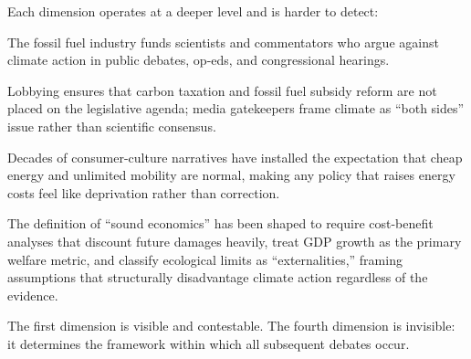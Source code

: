 Each dimension operates at a deeper level and is harder to detect:

\begin{center}
\end{center}

\begin{example}
\label{ex:four-dimensions-climate}
\begin{description}[nosep]
  \item[First dimension:] The fossil fuel industry funds scientists and commentators who argue against climate action in public debates, op-eds, and congressional hearings.
  \item[Second dimension:] Lobbying ensures that carbon taxation and fossil fuel subsidy reform are not placed on the legislative agenda; media gatekeepers frame climate as ``both sides'' issue rather than scientific consensus.
  \item[Third dimension:] Decades of consumer-culture narratives have installed the expectation that cheap energy and unlimited mobility are normal, making any policy that raises energy costs feel like deprivation rather than correction.
  \item[Fourth dimension:] The definition of ``sound economics'' has been shaped to require cost-benefit analyses that discount future damages heavily, treat GDP growth as the primary welfare metric, and classify ecological limits as ``externalities,'' framing assumptions that structurally disadvantage climate action regardless of the evidence.
\end{description}
The first dimension is visible and contestable.
The fourth dimension is invisible: it determines the framework within which all subsequent debates occur.
\end{example}


